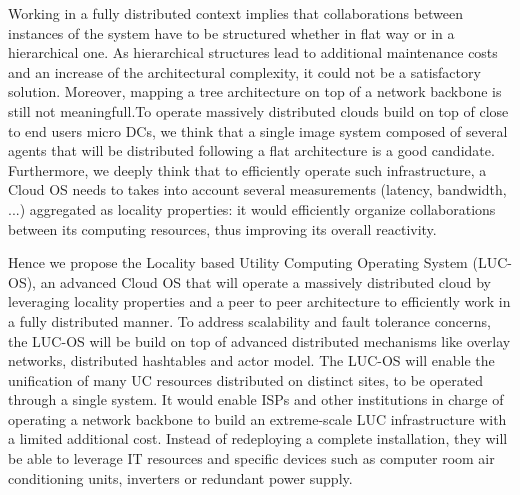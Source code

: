 Working in a fully distributed context implies that collaborations between 
instances of the system have to be structured whether in flat way or in a 
hierarchical one. As hierarchical structures lead to additional maintenance 
costs and an increase of the architectural complexity, it could not be a 
satisfactory solution. Moreover, mapping a tree architecture on top of a network
backbone is still not meaningfull.To operate massively distributed clouds build 
on top of close to end users micro DCs, we think that a single image system 
composed of several agents that will be distributed following a flat 
architecture is a good candidate. Furthermore, we deeply think that to 
efficiently operate such infrastructure, a Cloud OS needs to takes into account 
several measurements (latency, bandwidth, ...) aggregated as locality 
properties: it would efficiently organize collaborations between its computing 
resources, thus improving its overall reactivity. 

Hence we propose the Locality based Utility Computing Operating System (LUC-OS),
an advanced Cloud OS that will operate a massively distributed cloud by 
leveraging locality properties and a peer to peer architecture to efficiently 
work in a fully distributed manner. To address scalability and fault tolerance 
concerns, the LUC-OS will be build on top of advanced distributed mechanisms 
like overlay networks, distributed hashtables and actor model. The LUC-OS will 
enable the unification of many UC resources distributed on distinct sites, to be
operated through a single system. It would enable ISPs and other institutions in
charge of operating a network backbone to build an extreme-scale LUC 
infrastructure with a limited additional cost. Instead of redeploying a complete
installation, they will be able to leverage IT resources and specific devices 
such as computer room air conditioning units, inverters or redundant power 
supply.

